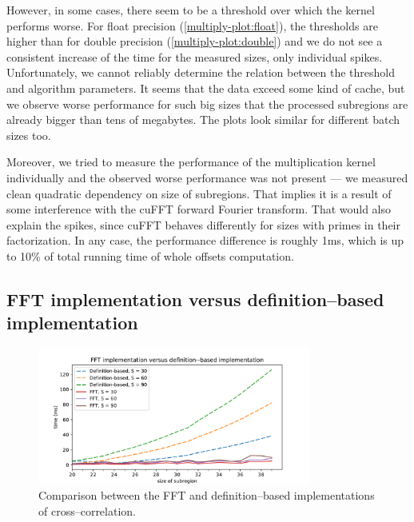 However, in some cases, there seem to be a threshold over which the kernel performs worse. For float precision (\cref {multiply-plot:float}), the thresholds are higher than for double precision (\cref {multiply-plot:double}) and we do not see a consistent increase of the time for the measured sizes, only individual spikes. Unfortunately, we cannot reliably determine the relation between the threshold and algorithm parameters. It seems that the data exceed some kind of cache, but we observe worse performance for such big sizes that the processed subregions are already bigger than tens of megabytes. The plots look similar for different batch sizes too.

Moreover, we tried to measure the performance of the multiplication kernel individually and the observed worse performance was not present --- we measured clean quadratic dependency on size of subregions. That implies it is a result of some interference with the cuFFT forward Fourier transform. That would also explain the spikes, since cuFFT behaves differently for sizes with primes in their factorization. In any case, the performance difference is roughly 1ms, which is up to 10\% of total running time of whole offsets computation.

\subsection{FFT implementation versus definition--based implementation}

\begin{figure}
	\centering
	\includegraphics[width=0.8\textwidth]{img/eval/cross-compare}
	\caption{Comparison between the FFT and definition--based implementations of cross--correlation.}
	\label{cross-compare}
\end{figure}

